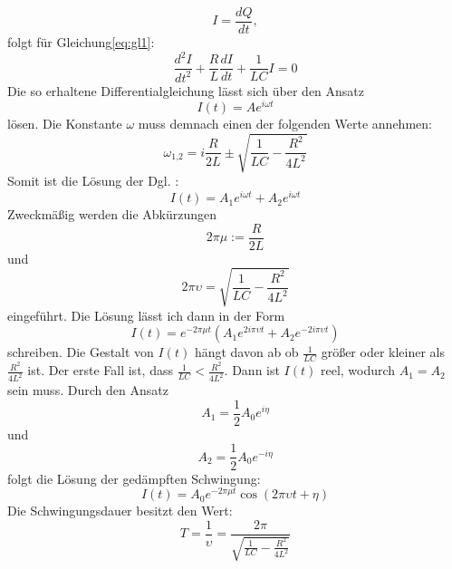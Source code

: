 \begin{equation}
  I = \frac{dQ}{dt} ,
\end{equation}
folgt für Gleichung\eqref{eq:gl1}:
\begin{equation}
  \label{eq:gl2}
  \frac{d^2I}{dt^2}+\frac{R}{L}\frac{dI}{dt}+\frac{1}{LC}I =0
\end{equation}
 Die so erhaltene Differentialgleichung lässt sich über den Ansatz
 \begin{equation}
   \label{eq:gl3}
   I(t) = A e^{i\omega t}
 \end{equation}
lösen.
Die Konstante $\omega$ muss demnach einen der folgenden Werte annehmen:
\begin{equation}
  \omega_\text{1,2} = i \frac{R}{2L} \pm \sqrt{\frac{1}{LC} - \frac{R^2}{4L^2}}
\end{equation}
Somit ist die Lösung der Dgl. :
\begin{equation}
  I(t) = A_1 e^{i \omega t} + A_2 e^{i \omega t}
\end{equation}
Zweckmäßig werden die Abkürzungen
\begin{equation*}
  2\pi \mu := \frac{R}{2L}
\end{equation*}
und
\begin{equation*}
  2 \pi \upsilon = \sqrt{\frac{1}{LC}-\frac{R^2}{4L^2}}
\end{equation*}
eingeführt.
Die Lösung lässt ich dann in der Form
\begin{equation}
\label{eq:steig}
  I(t)= e^{-  2\pi \mu t} (A_1 e^{2 i \pi \upsilon t} + A_2 e^{-2 i \pi \upsilon t})
\end{equation}
schreiben.
Die Gestalt von $I(t)$ hängt davon ab ob $\frac{1}{LC}$ größer oder kleiner als $\frac{R^2}{4L^2}$ ist.
Der erste Fall ist, dass $\frac{1}{LC}<\frac{R^2}{4L^2}$.
Dann ist $I(t)$ reel, wodurch $A_1=A_2$ sein muss.
Durch den Ansatz
\begin{equation}
  A_1 = \frac{1}{2}A_0 e^{i \eta}
\end{equation}
und
\begin{equation}
A_2 = \frac{1}{2}A_0 e^{-i \eta}
\end{equation}
folgt die Lösung der gedämpften Schwingung:
\begin{equation}
  I(t) = A_0 e^{- 2 \pi \mu t} \cos(2 \pi \upsilon t + \eta)
\end{equation}
Die Schwingungsdauer besitzt den Wert:
\begin{equation}
  T = \frac{1}{\upsilon}=\frac{2 \pi}{\sqrt{\frac{1}{LC}-\frac{R^2}{4L^2}}}
\end{equation}
